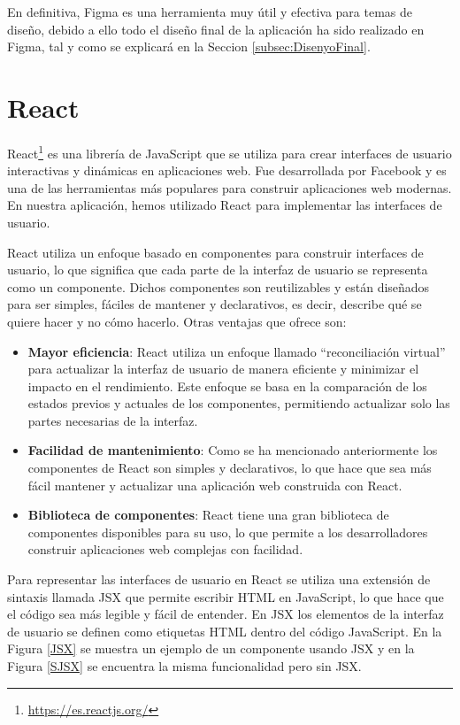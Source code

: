 En definitiva, Figma es una herramienta muy útil y efectiva para temas de diseño, debido a ello todo el diseño final de la aplicación ha sido realizado en Figma, tal y como se explicará en la Seccion \ref{subsec:DisenyoFinal}.

\section{React}\label{sec:React}
React\footnote{\url{https://es.reactjs.org/}} es una librería de JavaScript que se utiliza para crear interfaces de usuario interactivas y dinámicas en aplicaciones web. Fue desarrollada por Facebook y es una de las herramientas más populares para construir aplicaciones web modernas. En nuestra aplicación, hemos utilizado React para implementar las interfaces de usuario.

React utiliza un enfoque basado en componentes para construir interfaces de usuario, lo que significa que cada parte de la interfaz de usuario se representa como un componente. Dichos componentes son reutilizables y están diseñados para ser simples, fáciles de mantener y declarativos, es decir, describe qué se quiere hacer y no cómo hacerlo. Otras ventajas que ofrece son:

\begin{itemize}
  \item \textbf{Mayor eficiencia}: React utiliza un enfoque llamado ``reconciliación virtual'' para actualizar la interfaz de usuario de manera eficiente y minimizar el impacto en el rendimiento. Este enfoque se basa en la comparación de los estados previos y actuales de los componentes, permitiendo actualizar solo las partes necesarias de la interfaz.
  \item \textbf{Facilidad de mantenimiento}: Como se ha mencionado anteriormente los componentes de React son simples y declarativos, lo que hace que sea más fácil mantener y actualizar una aplicación web construida con React.
  \item \textbf{Biblioteca de componentes}: React tiene una gran biblioteca de componentes disponibles para su uso, lo que permite a los desarrolladores construir aplicaciones web complejas con facilidad.
\end{itemize}

Para representar las interfaces de usuario en React se utiliza una extensión de sintaxis llamada JSX que permite escribir HTML en JavaScript, lo que hace que el código sea más legible y fácil de entender. En JSX los elementos de la interfaz de usuario se definen como etiquetas HTML dentro del código JavaScript. En la Figura \ref{JSX} se muestra un ejemplo de un componente usando JSX y en la Figura \ref{SJSX} se encuentra la misma funcionalidad pero sin JSX.

